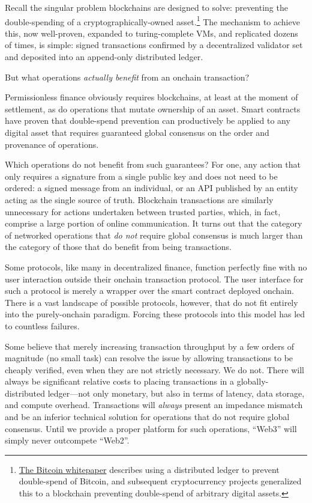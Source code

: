 \documentclass[runningheads]{llncs}
\begin{document}
Recall the singular problem blockchains are designed to solve: preventing the double-spending of a cryptographically-owned asset.\footnote{\href{https://bitcoin.org/bitcoin.pdf}{The Bitcoin whitepaper} describes using a distributed ledger to prevent double-spend of Bitcoin, and subsequent cryptocurrency projects generalized this to a blockchain preventing double-spend of arbitrary digital assets.}
The mechanism to achieve this, now well-proven, expanded to turing-complete VMs, and replicated dozens of times, is simple: signed transactions confirmed by a decentralized validator set and deposited into an append-only distributed ledger.

But what operations \textit{actually benefit} from an onchain transaction?

Permissionless finance obviously requires blockchains, at least at the moment of settlement, as do operations that mutate ownership of an asset.
Smart contracts have proven that double-spend prevention can productively be applied to any digital asset that requires guaranteed global consensus on the order and provenance of operations.

Which operations do not benefit from such guarantees?
For one, any action that only requires a signature from a single public key and does not need to be ordered:
a signed message from an individual, or an API published by an entity acting as the single source of truth.
Blockchain transactions are similarly unnecessary for actions undertaken between trusted parties, which, in fact, comprise a large portion of online communication.
It turns out that the category of networked operations that \textit{do not} require global consensus is much larger than the category of those that do benefit from being transactions.

Some protocols, like many in decentralized finance, function perfectly fine with no user interaction outside their onchain transaction protocol.
The user interface for such a protocol is merely a wrapper over the smart contract deployed onchain.
There is a vast landscape of possible protocols, however, that do not fit entirely into the purely-onchain paradigm.
Forcing these protocols into this model has led to countless failures.

Some believe that merely increasing transaction throughput by a few orders of magnitude (no small task) can resolve the issue by allowing transactions to be cheaply verified, even when they are not strictly necessary.
We do not.
There will always be significant relative costs to placing transactions in a globally-distributed ledger—not only monetary, but also in terms of latency, data storage, and compute overhead.
Transactions will \textit{always} present an impedance mismatch and be an inferior technical solution for operations that do not require global consensus.
Until we provide a proper platform for such operations, ``Web3'' will simply never outcompete ``Web2''.
\end{document}
